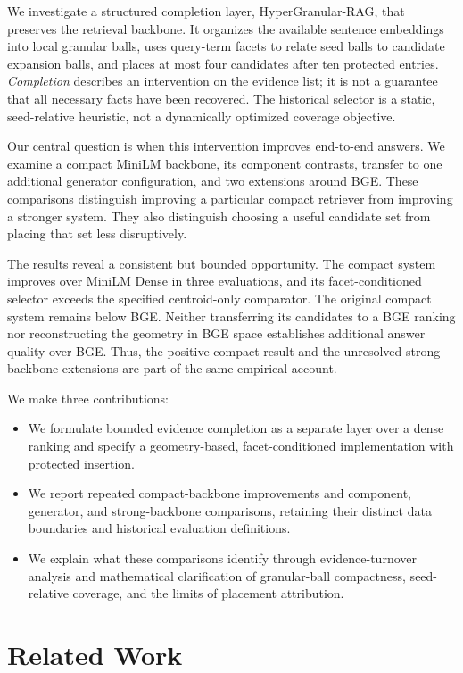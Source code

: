\documentclass[11pt]{article}
\newcommand{\hgrag}{HyperGranular-RAG\xspace}
\begin{document}
We investigate a structured completion layer, \hgrag, that preserves the
retrieval backbone. It organizes the available sentence embeddings into local
granular balls, uses query-term facets to relate seed balls to candidate
expansion balls, and places at most four candidates after ten protected
entries. \emph{Completion} describes an intervention on the evidence list; it is
not a guarantee that all necessary facts have been recovered. The historical
selector is a static, seed-relative heuristic, not a dynamically optimized
coverage objective.

Our central question is when this intervention improves end-to-end answers.
We examine a compact MiniLM backbone, its component contrasts, transfer to one
additional generator configuration, and two extensions around BGE. These
comparisons distinguish improving a particular compact retriever from
improving a stronger system. They also distinguish choosing a useful candidate
set from placing that set less disruptively.

The results reveal a consistent but bounded opportunity. The compact system
improves over MiniLM Dense in three evaluations, and its facet-conditioned
selector exceeds the specified centroid-only comparator. The original compact
system remains below BGE. Neither transferring its candidates to a BGE
ranking nor reconstructing the geometry in BGE space establishes additional
answer quality over BGE. Thus, the positive compact result and the unresolved
strong-backbone extensions are part of the same empirical account.

We make three contributions:
\begin{itemize}
\item We formulate bounded evidence completion as a separate layer over a
dense ranking and specify a geometry-based, facet-conditioned implementation
with protected insertion.
\item We report repeated compact-backbone improvements and component,
generator, and strong-backbone comparisons, retaining their distinct data
boundaries and historical evaluation definitions.
\item We explain what these comparisons identify through evidence-turnover
analysis and mathematical clarification of granular-ball compactness,
seed-relative coverage, and the limits of placement attribution.
\end{itemize}

\section{Related Work}
\end{document}
